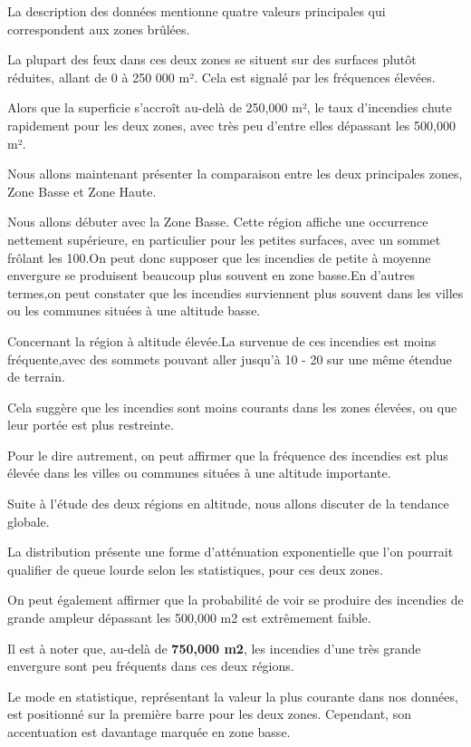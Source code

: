 \documentclass[
]{article}
\begin{document}
La description des données mentionne quatre valeurs principales qui
correspondent aux zones brûlées.

La plupart des feux dans ces deux zones se situent sur des surfaces
plutôt réduites, allant de 0 à 250 000 m². Cela est signalé par les
fréquences élevées.

Alors que la superficie s'accroît au-delà de 250,000 m², le taux
d'incendies chute rapidement pour les deux zones, avec très peu d'entre
elles dépassant les 500,000 m².

Nous allons maintenant présenter la comparaison entre les deux
principales zones, Zone Basse et Zone Haute.

Nous allons débuter avec la Zone Basse. Cette région affiche une
occurrence nettement supérieure, en particulier pour les petites
surfaces, avec un sommet frôlant les 100.On peut donc supposer que les
incendies de petite à moyenne envergure se produisent beaucoup plus
souvent en zone basse.En d'autres termes,on peut constater que les
incendies surviennent plus souvent dans les villes ou les communes
situées à une altitude basse.

Concernant la région à altitude élevée.La survenue de ces incendies est
moins fréquente,avec des sommets pouvant aller jusqu'à 10 - 20 sur une
même étendue de terrain.

Cela suggère que les incendies sont moins courants dans les zones
élevées, ou que leur portée est plus restreinte.

Pour le dire autrement, on peut affirmer que la fréquence des incendies
est plus élevée dans les villes ou communes situées à une altitude
importante.

Suite à l'étude des deux régions en altitude, nous allons discuter de la
tendance globale.

La distribution présente une forme d'atténuation exponentielle que l'on
pourrait qualifier de queue lourde selon les statistiques, pour ces deux
zones.

On peut également affirmer que la probabilité de voir se produire des
incendies de grande ampleur dépassant les 500,000 m2 est extrêmement
faible.

Il est à noter que, au-delà de \textbf{750,000 m2}, les incendies d'une
très grande envergure sont peu fréquents dans ces deux régions.

Le mode en statistique, représentant la valeur la plus courante dans nos
données, est positionné sur la première barre pour les deux zones.
Cependant, son accentuation est davantage marquée en zone basse.
\end{document}
